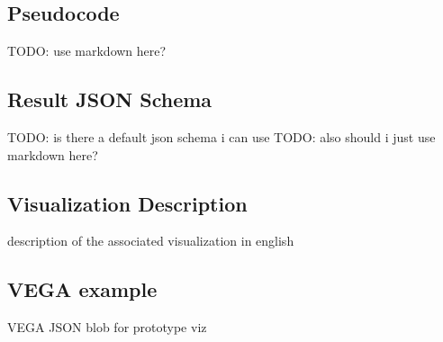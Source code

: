 \documentclass{article}
\begin{document}
  \subsection{Pseudocode}
  TODO: use markdown here?
  \subsection{Result JSON Schema}
  TODO: is there a default json schema i can use
  TODO: also should i just use markdown here?
  \subsection{Visualization Description}
  description of the associated visualization in english
  \subsection{VEGA example}
  VEGA JSON blob for prototype viz
\end{document}
